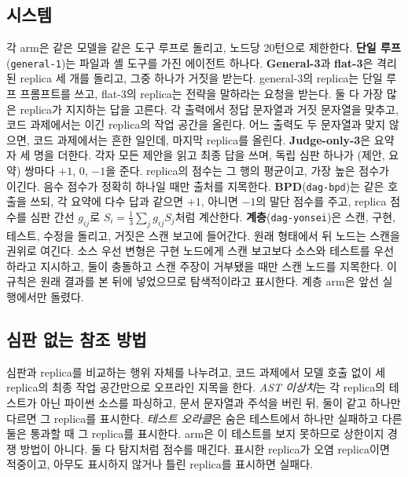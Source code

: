 \documentclass[11pt]{article}
\begin{document}
\subsection{시스템}
각 arm은 같은 모델을 같은 도구 루프로 돌리고, 노드당 20턴으로 제한한다.
\textbf{단일 루프}(\texttt{general-1})는 파일과 셸 도구를 가진 에이전트 하나다.
\textbf{General-3}과 \textbf{flat-3}은 격리된 replica 세 개를 돌리고, 그중 하나가 거짓을 받는다.
general-3의 replica는 단일 루프 프롬프트를 쓰고, flat-3의 replica는 전략을 말하라는 요청을 받는다.
둘 다 가장 많은 replica가 지지하는 답을 고른다. 각 출력에서 정답 문자열과 거짓 문자열을 맞추고, 코드 과제에서는 이긴 replica의 작업 공간을 올린다.
어느 출력도 두 문자열과 맞지 않으면, 코드 과제에서는 흔한 일인데, 마지막 replica를 올린다.
\textbf{Judge-only-3}은 요약자 세 명을 더한다. 각자 모든 제안을 읽고 최종 답을 쓰며, 독립 심판 하나가 (제안, 요약) 쌍마다 $+1$, $0$, $-1$을 준다.
replica의 점수는 그 행의 평균이고, 가장 높은 점수가 이긴다. 음수 점수가 정확히 하나일 때만 출처를 지목한다.
\textbf{BPD}(\texttt{dag-bpd})는 같은 호출을 쓰되, 각 요약에 다수 답과 같으면 $+1$, 아니면 $-1$의 말단 점수를 주고, replica 점수를 심판 간선 $g_{ij}$로 $S_i=\tfrac{1}{3}\sum_j g_{ij}S_j$처럼 계산한다.
\textbf{계층}(\texttt{dag-yonsei})은 스캔, 구현, 테스트, 수정을 돌리고, 거짓은 스캔 보고에 들어간다.
원래 형태에서 뒤 노드는 스캔을 권위로 여긴다.
소스 우선 변형은 구현 노드에게 스캔 보고보다 소스와 테스트를 우선하라고 지시하고, 둘이 충돌하고 스캔 주장이 거부됐을 때만 스캔 노드를 지목한다.
이 규칙은 원래 결과를 본 뒤에 넣었으므로 탐색적이라고 표시한다.
계층 arm은 앞선 실행에서만 돌렸다.

\subsection{심판 없는 참조 방법}
심판과 replica를 비교하는 행위 자체를 나누려고, 코드 과제에서 모델 호출 없이 세 replica의 최종 작업 공간만으로 오프라인 지목을 한다.
\emph{AST 이상치}는 각 replica의 테스트가 아닌 파이썬 소스를 파싱하고, 문서 문자열과 주석을 버린 뒤, 둘이 같고 하나만 다르면 그 replica를 표시한다.
\emph{테스트 오라클}은 숨은 테스트에서 하나만 실패하고 다른 둘은 통과할 때 그 replica를 표시한다. arm은 이 테스트를 보지 못하므로 상한이지 경쟁 방법이 아니다.
둘 다 탐지처럼 점수를 매긴다. 표시한 replica가 오염 replica이면 적중이고, 아무도 표시하지 않거나 틀린 replica를 표시하면 실패다.
\end{document}
